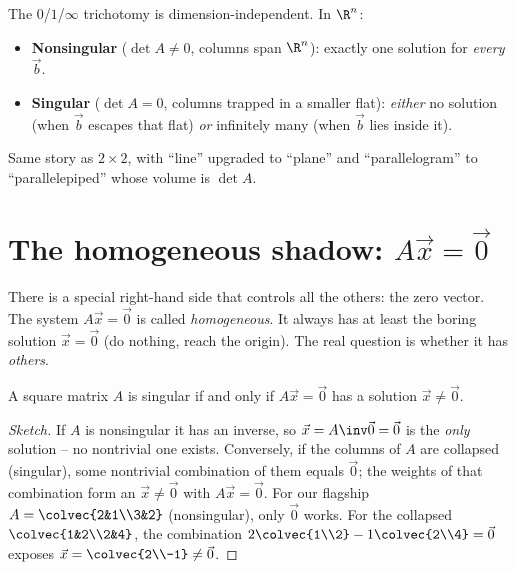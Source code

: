 \begin{focusbox}
The $0$/$1$/$\infty$ trichotomy is dimension-independent. In $\R^n$:
\begin{itemize}
  \item \textbf{Nonsingular} ($\det A\neq0$, columns span $\R^n$): exactly
  one solution for \emph{every} $\vec b$.
  \item \textbf{Singular} ($\det A=0$, columns trapped in a smaller flat):
  \emph{either} no solution (when $\vec b$ escapes that flat) \emph{or}
  infinitely many (when $\vec b$ lies inside it).
\end{itemize}
Same story as $2\times2$, with ``line'' upgraded to ``plane'' and
``parallelogram'' to ``parallelepiped'' whose volume is $\det A$.
\end{focusbox}

\section{The homogeneous shadow: $A\vec x=\vec 0$}

There is a special right-hand side that controls all the others: the zero
vector. The system $A\vec x=\vec 0$ is called \emph{homogeneous}. It always
has at least the boring solution $\vec x=\vec 0$ (do nothing, reach the
origin). The real question is whether it has \emph{others}.

\begin{theorem}
\label{ch06:homog}
A square matrix $A$ is singular if and only if $A\vec x=\vec 0$ has a
solution $\vec x\neq\vec 0$.
\end{theorem}

\begin{proof}[Sketch]
If $A$ is nonsingular it has an inverse, so $\vec x=A\inv\vec 0=\vec 0$ is
the \emph{only} solution -- no nontrivial one exists. Conversely, if the
columns of $A$ are collapsed (singular), some nontrivial combination of them
equals $\vec 0$; the weights of that combination form an $\vec x\neq\vec0$
with $A\vec x=\vec0$. For our flagship $A=\colvec{2&1\\3&2}$ (nonsingular),
only $\vec0$ works. For the collapsed $\colvec{1&2\\2&4}$, the combination
$2\colvec{1\\2}-1\colvec{2\\4}=\vec0$ exposes $\vec x=\colvec{2\\-1}\neq\vec0$.
\end{proof}

